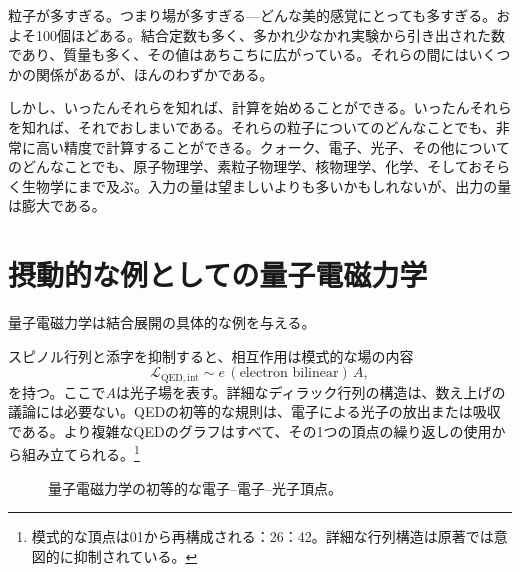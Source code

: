 \begin{classroomqa}
\end{classroomqa}

粒子が多すぎる。つまり場が多すぎる---どんな美的感覚にとっても多すぎる。およそ100個ほどある。結合定数も多く、多かれ少なかれ実験から引き出された数であり、質量も多く、その値はあちこちに広がっている。それらの間にはいくつかの関係があるが、ほんのわずかである。

しかし、いったんそれらを知れば、計算を始めることができる。いったんそれらを知れば、それでおしまいである。それらの粒子についてのどんなことでも、非常に高い精度で計算することができる。クォーク、電子、光子、その他についてのどんなことでも、原子物理学、素粒子物理学、核物理学、化学、そしておそらく生物学にまで及ぶ。入力の量は望ましいよりも多いかもしれないが、出力の量は膨大である。

\section{摂動的な例としての量子電磁力学}

量子電磁力学は結合展開の具体的な例を与える。

\begin{classroomqa}
\end{classroomqa}

スピノル行列と添字を抑制すると、相互作用は模式的な場の内容
\begin{equation}
\mathcal{L}_{\mathrm{QED,int}}
\sim e\,(\text{electron bilinear})\,A,
\end{equation}
を持つ。ここで\(A\)は光子場を表す。詳細なディラック行列の構造は、数え上げの議論には必要ない。QEDの初等的な規則は、電子による光子の放出または吸収である。より複雑なQEDのグラフはすべて、その1つの頂点の繰り返しの使用から組み立てられる。\footnote{模式的な頂点は01から再構成される：26：42。詳細な行列構造は原著では意図的に抑制されている。}

\begin{figure}[htbp]
\centering
{}
\caption{量子電磁力学の初等的な電子--電子--光子頂点。}
\end{figure}


